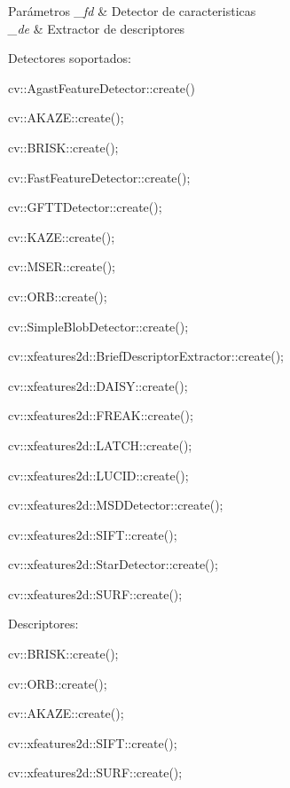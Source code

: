 \begin{DoxyParams}{Parámetros}
{\em \+\_\+fd} & Detector de caracteristicas \\
\hline
{\em \+\_\+de} & Extractor de descriptores\\
\hline
\end{DoxyParams}
Detectores soportados\+:
\begin{DoxyItemize}
\item cv\+::\+Agast\+Feature\+Detector\+::create()
\item cv\+::\+A\+K\+A\+Z\+E\+::create();
\item cv\+::\+B\+R\+I\+S\+K\+::create();
\item cv\+::\+Fast\+Feature\+Detector\+::create();
\item cv\+::\+G\+F\+T\+T\+Detector\+::create();
\item cv\+::\+K\+A\+Z\+E\+::create();
\item cv\+::\+M\+S\+E\+R\+::create();
\item cv\+::\+O\+R\+B\+::create();
\item cv\+::\+Simple\+Blob\+Detector\+::create();
\item cv\+::xfeatures2d\+::\+Brief\+Descriptor\+Extractor\+::create();
\item cv\+::xfeatures2d\+::\+D\+A\+I\+S\+Y\+::create();
\item cv\+::xfeatures2d\+::\+F\+R\+E\+A\+K\+::create();
\item cv\+::xfeatures2d\+::\+L\+A\+T\+C\+H\+::create();
\item cv\+::xfeatures2d\+::\+L\+U\+C\+I\+D\+::create();
\item cv\+::xfeatures2d\+::\+M\+S\+D\+Detector\+::create();
\item cv\+::xfeatures2d\+::\+S\+I\+F\+T\+::create();
\item cv\+::xfeatures2d\+::\+Star\+Detector\+::create();
\item cv\+::xfeatures2d\+::\+S\+U\+R\+F\+::create();
\end{DoxyItemize}

Descriptores\+:
\begin{DoxyItemize}
\item cv\+::\+B\+R\+I\+S\+K\+::create();
\item cv\+::\+O\+R\+B\+::create();
\item cv\+::\+A\+K\+A\+Z\+E\+::create();
\item cv\+::xfeatures2d\+::\+S\+I\+F\+T\+::create();
\item cv\+::xfeatures2d\+::\+S\+U\+R\+F\+::create(); 
\end{DoxyItemize}

